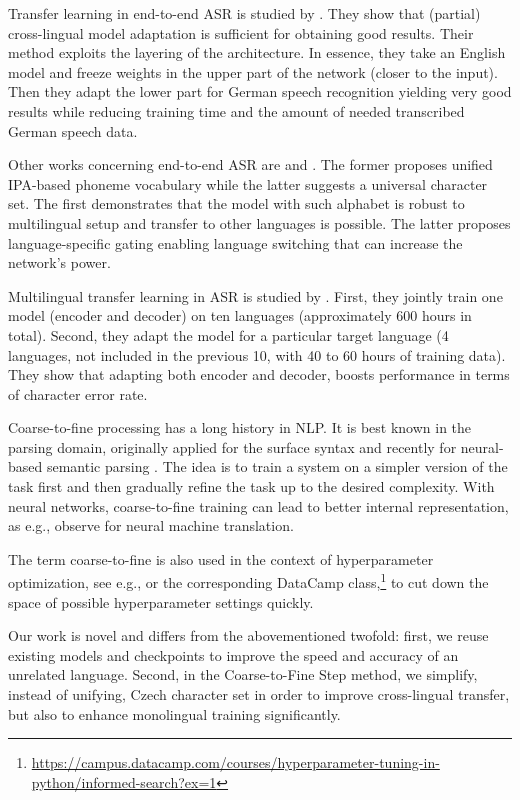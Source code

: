 Transfer learning in end-to-end ASR is studied by  . They show that (partial) cross-lingual model adaptation is sufficient for obtaining good results. Their method exploits the layering of the architecture. In essence, they take an English model and freeze weights in the upper part of the network (closer to the input). Then they adapt the lower part for German speech recognition yielding very good results while reducing training time and the amount of needed transcribed German speech data.

Other works concerning end-to-end ASR are  and . The former proposes unified IPA-based phoneme vocabulary while the latter suggests a universal character set. The first demonstrates that the model with such alphabet is robust to multilingual setup and transfer to other languages is possible. The latter proposes language-specific gating enabling language switching that can increase the network's power.

Multilingual transfer learning in ASR is studied by . First, they jointly train one model (encoder and decoder) on ten languages (approximately 600 hours in total). Second, they adapt the model %
for a particular target language (4 languages, not included in the previous 10, with 40 to 60 hours of training data). They show that adapting both encoder and decoder, boosts performance in terms of character error rate.

Coarse-to-fine processing  has a long history in NLP. It is best known in the parsing domain, originally applied for the surface syntax  and recently for neural-based semantic parsing . The idea is to train a system on a simpler version of the task first and then gradually refine the task up to the desired complexity. With neural networks, coarse-to-fine training can lead to better internal representation, as e.g.,  observe for neural machine translation.

The term coarse-to-fine is also used in the context of hyperparameter optimization, see e.g.,  or the corresponding DataCamp class,\footnote{\url{https://campus.datacamp.com/courses/hyperparameter-tuning-in-python/informed-search?ex=1}} to cut down the space of possible hyperparameter settings quickly.

Our work is novel and differs from the abovementioned twofold: first, we reuse existing models and checkpoints to improve the speed and accuracy of an unrelated language. Second, in the Coarse-to-Fine Step method, we simplify, instead of unifying, Czech character set in order to improve cross-lingual transfer, but also to enhance monolingual training significantly.


